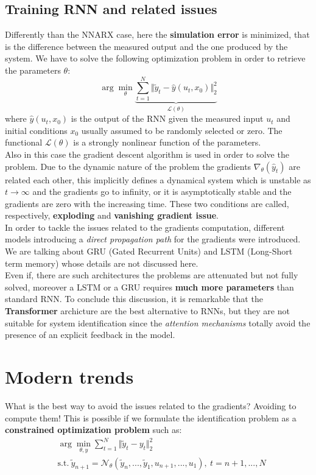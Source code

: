 \subsection{Training RNN and related issues}
Differently than the NNARX case, here the \textbf{simulation error} is minimized, that is the difference between the measured output and the one produced by the system. We have to solve the following optimization problem in order to retrieve the parameters $\theta$:
\begin{equation}
    \arg\min_{\theta} \underbrace{\sum_{t=1}^N{
        \Vert
            \tilde{y}_t - \hat{y}(u_t,x_0)
        \Vert_2^2}}_{\mathcal{L}(\theta)}
\end{equation}
where $\hat{y}(u_t,x_0)$ is the output of the RNN given the measured input $u_t$ and initial  conditions $x_0$ usually assumed to be randomly selected or zero. The functional $\mathcal{L}(\theta)$ is a strongly nonlinear function of the parameters. \\
Also in this case the gradient descent algorithm is used in order to solve the problem. Due to the dynamic nature of the problem the gradients $\nabla_\theta(\hat{y}_t)$ are related each other, this implicitly defines a dynamical system which is unstable as $t\to\infty$ and the gradients go to infinity, or it is asymptotically stable and the gradients are zero with the increasing time. These two conditions are called, respectively, \textbf{exploding} and \textbf{vanishing gradient issue}.\\
In order to tackle the issues related to the gradients computation, different models introducing a \textit{direct propagation path} for the gradients were introduced. We are talking about GRU (Gated Recurrent Units) and LSTM (Long-Short term memory) whose details are not discussed here.\\
Even if, there are such architectures the problems are attenuated but not fully solved, moreover a LSTM or a GRU requires \textbf{much more parameters} than standard RNN. To conclude this discussion, it is remarkable that the \textbf{Transformer} archicture are the best alternative to RNNs, but they are not suitable for system identification since the \textit{attention mechanisms} totally avoid the presence of an explicit feedback in the model.


\section{Modern trends}
What is the best way to avoid the issues related to the gradients? Avoiding to compute them! This is possible if we formulate the identification problem as a \textbf{constrained optimization problem} such as:
\begin{equation}
    \begin{aligned}
        &\arg \min_{\theta,y} \sum_{t=1}^N \Vert \tilde{y}_t - y_t \Vert_2^2\\
        &\text{s.t.} \ \tilde{y}_{n+1}=\mathcal{N}_\theta(\tilde{y}_n,...,\tilde{y}_1,u_{n+1},...,u_1), \ t=n+1,...,N
    \end{aligned}
\end{equation}

